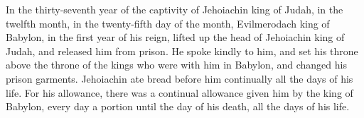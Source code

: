  In the thirty-seventh year of the captivity of Jehoiachin
king of Judah, in the twelfth month, in the twenty-fifth day of the
month, Evilmerodach king of Babylon, in the first year of his reign,
lifted up the head of Jehoiachin king of Judah, and released him from
prison.  He spoke kindly to him, and set his throne above
the throne of the kings who were with him in Babylon,  and
changed his prison garments. Jehoiachin ate bread before him continually
all the days of his life.  For his allowance, there was a
continual allowance given him by the king of Babylon, every day a
portion until the day of his death, all the days of his life.
